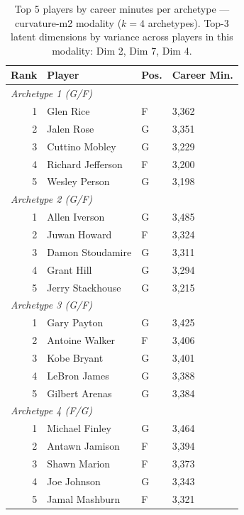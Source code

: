 \begin{table}[htbp]
  \centering\small
  \begin{tabular}{rlll}
    \toprule
    Rank & Player & Pos. & Career Min. \\
    \midrule
    \multicolumn{4}{l}{\textit{Archetype 1 (G/F)}} \\
    \midrule
    1 & Glen Rice & F & 3,362 \\
    2 & Jalen Rose & G & 3,351 \\
    3 & Cuttino Mobley & G & 3,229 \\
    4 & Richard Jefferson & F & 3,200 \\
    5 & Wesley Person & G & 3,198 \\
    \midrule[0.4pt]
    \multicolumn{4}{l}{\textit{Archetype 2 (G/F)}} \\
    \midrule
    1 & Allen Iverson & G & 3,485 \\
    2 & Juwan Howard & F & 3,324 \\
    3 & Damon Stoudamire & G & 3,311 \\
    4 & Grant Hill & G & 3,294 \\
    5 & Jerry Stackhouse & G & 3,215 \\
    \midrule[0.4pt]
    \multicolumn{4}{l}{\textit{Archetype 3 (G/F)}} \\
    \midrule
    1 & Gary Payton & G & 3,425 \\
    2 & Antoine Walker & F & 3,406 \\
    3 & Kobe Bryant & G & 3,401 \\
    4 & LeBron James & G & 3,388 \\
    5 & Gilbert Arenas & G & 3,384 \\
    \midrule[0.4pt]
    \multicolumn{4}{l}{\textit{Archetype 4 (F/G)}} \\
    \midrule
    1 & Michael Finley & G & 3,464 \\
    2 & Antawn Jamison & F & 3,394 \\
    3 & Shawn Marion & F & 3,373 \\
    4 & Joe Johnson & G & 3,343 \\
    5 & Jamal Mashburn & F & 3,321 \\
    \bottomrule
  \end{tabular}
  \caption{Top 5 players by career minutes per archetype --- curvature-m2 modality ($k=4$ archetypes). Top-3 latent dimensions by variance across players in this modality: Dim 2, Dim 7, Dim 4.}
  \label{tab:arch_reps_curvature_m2}
\end{table}

